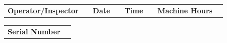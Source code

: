 \documentclass[9pt]{article}
\begin{document}
\renewcommand{\arraystretch}{1.05}

\newcommand{\entryrule}{\rule[-0.1cm]{0pt}{0.45cm}}
\newcommand{\entrybox}{\framebox[\linewidth]{\entryrule}}

\noindent
{\setlength{\tabcolsep}{3pt}%
\begin{tabularx}{\textwidth}{@{}
    >{\bfseries}p{3.3cm} X
    >{\bfseries}p{0.9cm} X
    >{\bfseries}p{0.9cm} X
    >{\bfseries}p{2.3cm} X
@{}}
Operator/Inspector & \entrybox &
Date & \entrybox &
Time & \entrybox &
Machine Hours & \entrybox
\end{tabularx}
}

\vspace{0.15cm}

\noindent
{\setlength{\tabcolsep}{3pt}%
\begin{tabularx}{\textwidth}{@{} >{\bfseries}p{3.3cm} X @{}}
Serial Number & \entrybox
\end{tabularx}
}

\vspace{0.2cm}
\end{document}

